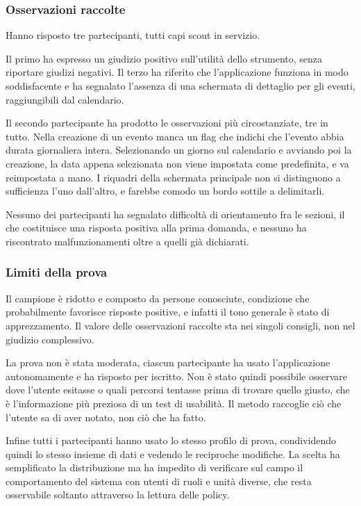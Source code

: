 \documentclass[11pt]{article}
\numberwithin{figure}{section}
\begin{document}
\subsubsection{Osservazioni raccolte}

Hanno risposto tre partecipanti, tutti capi scout in servizio.

Il primo ha espresso un giudizio positivo sull'utilità dello strumento, senza riportare giudizi negativi. Il terzo ha riferito che l'applicazione funziona in modo soddisfacente e ha segnalato l'assenza di una schermata di dettaglio per gli eventi, raggiungibili dal calendario.

Il secondo partecipante ha prodotto le osservazioni più circostanziate, tre in tutto. Nella creazione di un evento manca un flag che indichi che l'evento abbia durata giornaliera intera. Selezionando un giorno sul calendario e avviando poi la creazione, la data appena selezionata non viene impostata come predefinita, e va reimpostata a mano. I riquadri della schermata principale non si distinguono a sufficienza l'uno dall'altro, e farebbe comodo un bordo sottile a delimitarli.

Nessuno dei partecipanti ha segnalato difficoltà di orientamento fra le sezioni, il che costituisce una risposta positiva alla prima domanda, e nessuno ha riscontrato malfunzionamenti oltre a quelli già dichiarati.

\subsubsection{Limiti della prova}

Il campione è ridotto e composto da persone conosciute, condizione che probabilmente favorisce risposte positive, e infatti il tono generale è stato di apprezzamento. Il valore delle osservazioni raccolte sta nei singoli consigli, non nel giudizio complessivo.

La prova non è stata moderata, ciascun partecipante ha usato l'applicazione autonomamente e ha risposto per iscritto. Non è stato quindi possibile osservare dove l'utente esitasse o quali percorsi tentasse prima di trovare quello giusto, che è l'informazione più preziosa di un test di usabilità. Il metodo raccoglie ciò che l'utente sa di aver notato, non ciò che ha fatto.

Infine tutti i partecipanti hanno usato lo stesso profilo di prova, condividendo quindi lo stesso insieme di dati e vedendo le reciproche modifiche. La scelta ha semplificato la distribuzione ma ha impedito di verificare sul campo il comportamento del sistema con utenti di ruoli e unità diverse, che resta osservabile soltanto attraverso la lettura delle policy.
\end{document}
